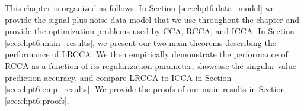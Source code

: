 This chapter is organized as follows. In Section \ref{sec:chpt6:data_model} we provide the
signal-plus-noise data model that we use throughout the chapter and provide the optimization
problems used by CCA, RCCA, and ICCA. In Section \ref{sec:chpt6:main_results}, we present our
two main theorems describing the performance of LRCCA. We then empirically demonstrate the
performance of RCCA as a function of its regularization parameter, showcase the singular
value prediction accuracy, and compare LRCCA to ICCA in Section \ref{sec:chpt6:emp_results}. We
provide the proofs of our main results in Section \ref{sec:chpt6:proofs}. 

\begin{figure}
  \centering
\end{figure}
